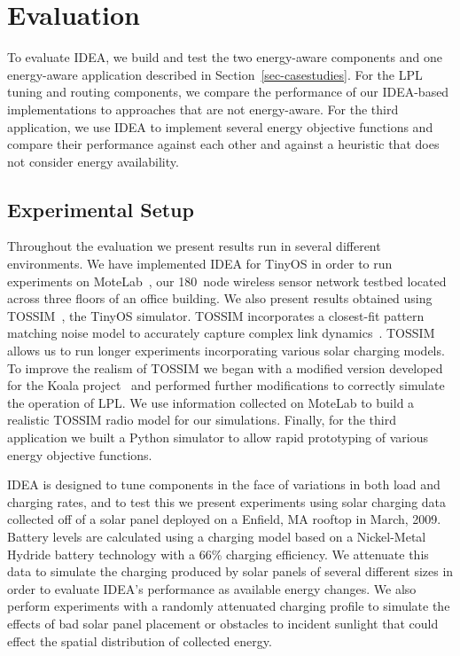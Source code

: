 \section{Evaluation}
\label{sec-evaluation}

To evaluate IDEA, we build and test the two energy-aware components and
one energy-aware application described in Section~\ref{sec-casestudies}. For
the LPL tuning and routing components, we compare the performance of our
IDEA-based implementations to approaches that are not energy-aware.
For the third application, we use IDEA to implement several energy objective
functions and compare their performance against each other and against a
heuristic that does not consider energy availability.

\subsection{Experimental Setup}
\label{subsec-experimentalsetup}

Throughout the evaluation we present results run in several different
environments. We have implemented IDEA for TinyOS in order to run experiments
on MoteLab~\cite{motelab}, our 180~node wireless sensor network testbed
located across three floors of an office building. We also present results
obtained using TOSSIM~\cite{tossim}, the TinyOS simulator.  TOSSIM
incorporates a closest-fit pattern matching noise model to accurately capture
complex link dynamics~\cite{cpm-ipsn07}. TOSSIM allows us to run longer
experiments incorporating various solar charging models. To improve the
realism of TOSSIM we began with a modified version developed for the Koala
project~\cite{koala-ipsn08} and performed further modifications to correctly
simulate the operation of LPL. We use information collected on MoteLab to
build a realistic TOSSIM radio model for our simulations.  Finally, for the
third application we built a Python simulator to allow rapid prototyping of
various energy objective functions.

IDEA is designed to tune components in the face of variations in both load
and charging rates, and to test this we present experiments using solar
charging data collected off of a solar panel deployed on a Enfield, MA
rooftop in March, 2009. Battery levels are calculated using a charging model
based on a Nickel-Metal Hydride battery technology with a 66\% charging
efficiency. We attenuate this data to simulate the charging produced by solar
panels of several different sizes in order to evaluate IDEA's performance as
available energy changes. We also perform experiments with a randomly
attenuated charging profile to simulate the effects of bad solar panel
placement or obstacles to incident sunlight that could effect the spatial
distribution of collected energy.

